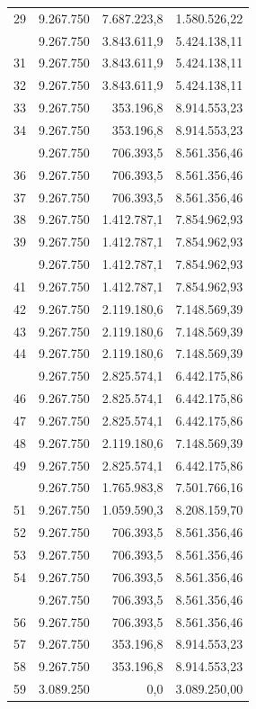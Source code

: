 \documentclass[
  10pt,
  a4paper]{article}
\begin{document}
\begin{longtable}[t]{rrrr}
29 & 9.267.750 & 7.687.223,8 & 1.580.526,22\\
\addlinespace
30 & 9.267.750 & 3.843.611,9 & 5.424.138,11\\
31 & 9.267.750 & 3.843.611,9 & 5.424.138,11\\
32 & 9.267.750 & 3.843.611,9 & 5.424.138,11\\
33 & 9.267.750 & 353.196,8 & 8.914.553,23\\
34 & 9.267.750 & 353.196,8 & 8.914.553,23\\
\addlinespace
35 & 9.267.750 & 706.393,5 & 8.561.356,46\\
36 & 9.267.750 & 706.393,5 & 8.561.356,46\\
37 & 9.267.750 & 706.393,5 & 8.561.356,46\\
38 & 9.267.750 & 1.412.787,1 & 7.854.962,93\\
39 & 9.267.750 & 1.412.787,1 & 7.854.962,93\\
\addlinespace
40 & 9.267.750 & 1.412.787,1 & 7.854.962,93\\
41 & 9.267.750 & 1.412.787,1 & 7.854.962,93\\
42 & 9.267.750 & 2.119.180,6 & 7.148.569,39\\
43 & 9.267.750 & 2.119.180,6 & 7.148.569,39\\
44 & 9.267.750 & 2.119.180,6 & 7.148.569,39\\
\addlinespace
45 & 9.267.750 & 2.825.574,1 & 6.442.175,86\\
46 & 9.267.750 & 2.825.574,1 & 6.442.175,86\\
47 & 9.267.750 & 2.825.574,1 & 6.442.175,86\\
48 & 9.267.750 & 2.119.180,6 & 7.148.569,39\\
49 & 9.267.750 & 2.825.574,1 & 6.442.175,86\\
\addlinespace
50 & 9.267.750 & 1.765.983,8 & 7.501.766,16\\
51 & 9.267.750 & 1.059.590,3 & 8.208.159,70\\
52 & 9.267.750 & 706.393,5 & 8.561.356,46\\
53 & 9.267.750 & 706.393,5 & 8.561.356,46\\
54 & 9.267.750 & 706.393,5 & 8.561.356,46\\
\addlinespace
55 & 9.267.750 & 706.393,5 & 8.561.356,46\\
56 & 9.267.750 & 706.393,5 & 8.561.356,46\\
57 & 9.267.750 & 353.196,8 & 8.914.553,23\\
58 & 9.267.750 & 353.196,8 & 8.914.553,23\\
59 & 3.089.250 & 0,0 & 3.089.250,00\\
\bottomrule
\end{longtable}
\end{document}
